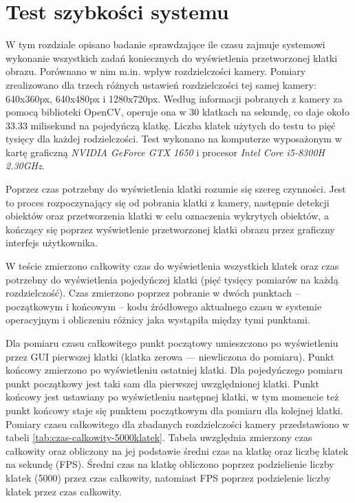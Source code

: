 \chapter{Test szybkości systemu}
\label{chap:test-szybkosci}
W tym rozdziale opisano badanie sprawdzające ile czasu zajmuje systemowi wykonanie wszystkich zadań koniecznych do wyświetlenia przetworzonej klatki obrazu. Porównano w nim m.in. wpływ rozdzielczości kamery. Pomiary zrealizowano dla trzech różnych ustawień rozdzielczości tej samej kamery: 640x360px, 640x480px i 1280x720px.
Według informacji pobranych z kamery za pomocą biblioteki OpenCV, operuje ona w 30 klatkach na sekundę, co daje około 33.33 milisekund na pojedyńczą klatkę. Liczba klatek użytych do testu to pięć tysięcy dla każdej rodzielczości.
Test wykonano na komputerze wyposażonym w kartę graficzną \emph{NVIDIA GeForce GTX 1650} i procesor \emph{Intel Core i5-8300H 2.30GHz}.

Poprzez czas potrzebny do wyświetlenia klatki rozumie się szereg czynności. Jest to proces rozpoczynający się od pobrania klatki z kamery, następnie detekcji obiektów oraz przetworzenia klatki w celu oznaczenia wykrytych obiektów, a kończący się poprzez wyświetlenie przetworzonej klatki obrazu przez graficzny interfejs użytkownika. 

W teście zmierzono całkowity czas do wyświetlenia wszystkich klatek oraz czas potrzebny do wyświetlenia pojedyńczej klatki (pięć tysięcy pomiarów na każdą rozdzielczość). Czas zmierzono poprzez pobranie w dwóch punktach -- początkowym i końcowym -- kodu źródłowego aktualnego czasu w systemie operacyjnym i obliczeniu różnicy jaka wystąpiła między tymi punktami. 

Dla pomiaru czasu całkowitego punkt początowy umieszczono po wyświetleniu przez GUI pierwszej klatki (klatka zerowa --- niewliczona do pomiaru). Punkt końcowy zmierzono po wyświetleniu ostatniej klatki.
Dla pojedyńczego pomiaru punkt początkowy jest taki sam dla pierwszej uwzględnionej klatki. Punkt końcowy jest ustawiany po wyświetleniu następnej klatki, w tym momencie też punkt końcowy staje się punktem początkowym dla pomiaru dla kolejnej klatki.
Pomiary czasu całkowitego dla zbadanych rozdzielczości kamery przedstawiono w tabeli \ref{tab:czas-calkowity-5000klatek}. Tabela uwzględnia zmierzony czas całkowity oraz obliczony na jej podstawie średni czas na klatkę oraz liczbę klatek na sekundę (FPS). Średni czas na klatkę obliczono poprzez podzielienie liczby klatek (5000) przez czas całkowity, natomiast FPS poprzez podzielenie liczby klatek przez czas całkowity.  



